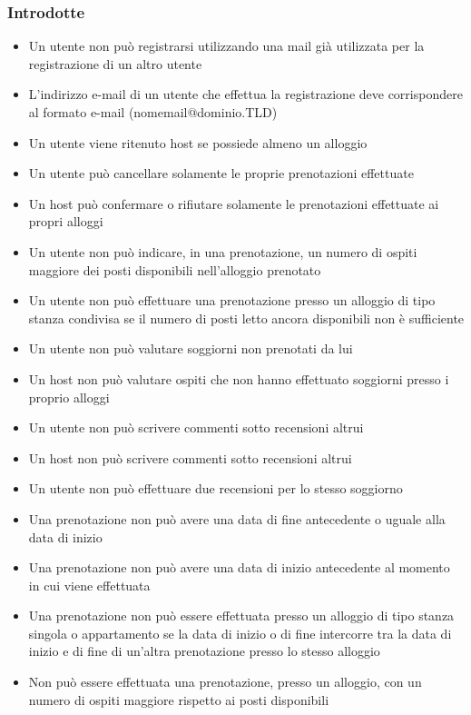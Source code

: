 \subsubsection{Introdotte}
\begin{itemize}
  \item Un utente non può registrarsi utilizzando una mail già utilizzata per la registrazione di un altro utente
  \item L'indirizzo e-mail di un utente che effettua la registrazione deve corrispondere al formato e-mail (nomemail@dominio.TLD)
  \item Un utente viene ritenuto host se possiede almeno un alloggio
  \item Un utente può cancellare solamente le proprie prenotazioni effettuate
  \item Un host può confermare o rifiutare solamente le prenotazioni effettuate ai propri alloggi
  \item Un utente non può indicare, in una prenotazione, un numero di ospiti maggiore dei posti disponibili nell'alloggio prenotato
  \item Un utente non può effettuare una prenotazione presso un alloggio di tipo stanza condivisa se il numero di posti letto ancora disponibili non è sufficiente
  \item Un utente non può valutare soggiorni non prenotati da lui
  \item Un host non può valutare ospiti che non hanno effettuato soggiorni presso i proprio alloggi
  \item Un utente non può scrivere commenti sotto recensioni altrui
  \item Un host non può scrivere commenti sotto recensioni altrui
  \item Un utente non può effettuare due recensioni per lo stesso soggiorno
  \item Una prenotazione non può avere una data di fine antecedente o uguale alla data di inizio
  \item Una prenotazione non può avere una data di inizio antecedente al momento in cui viene effettuata
  \item Una prenotazione non può essere effettuata presso un alloggio di tipo stanza singola o appartamento se la data di inizio o di fine intercorre tra la data di inizio e di fine di un'altra prenotazione presso lo stesso alloggio
  \item Non può essere effettuata una prenotazione, presso un alloggio, con un numero di ospiti maggiore rispetto ai posti disponibili
\end{itemize}